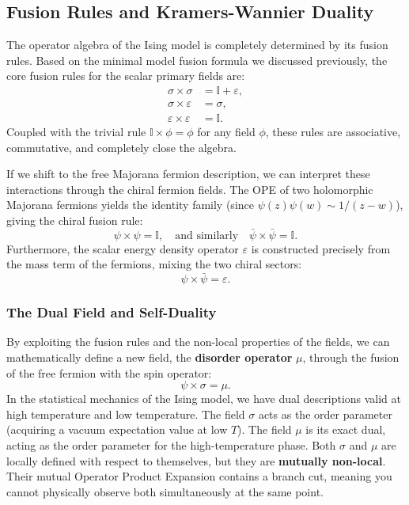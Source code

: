 \subsection{Fusion Rules and Kramers-Wannier Duality}

The operator algebra of the Ising model is completely determined by its fusion rules. Based on the minimal model fusion formula we discussed previously, the core fusion rules for the scalar primary fields are:
\[
    \begin{aligned}
        \sigma \times \sigma           & = \mathbb{I} + \varepsilon, \\
        \sigma \times \varepsilon      & = \sigma,                   \\
        \varepsilon \times \varepsilon & = \mathbb{I}.
    \end{aligned}
\]
Coupled with the trivial rule \(\mathbb{I} \times \phi = \phi\) for any field \(\phi\), these rules are associative, commutative, and completely close the algebra.

If we shift to the free Majorana fermion description, we can interpret these interactions through the chiral fermion fields. The OPE of two holomorphic Majorana fermions yields the identity family (since \(\psi(z)\psi(w) \sim 1/(z-w)\)), giving the chiral fusion rule:
\[
    \psi \times \psi = \mathbb{I}, \quad \text{and similarly} \quad \bar{\psi} \times \bar{\psi} = \mathbb{I}.
\]
Furthermore, the scalar energy density operator \(\varepsilon\) is constructed precisely from the mass term of the fermions, mixing the two chiral sectors:
\[
    \psi \times \bar{\psi} = \varepsilon.
\]

\subsubsection{The Dual Field and Self-Duality}

By exploiting the fusion rules and the non-local properties of the fields, we can mathematically define a new field, the \textbf{disorder operator} \(\mu\), through the fusion of the free fermion with the spin operator:
\[
    \psi \times \sigma = \mu.
\]
In the statistical mechanics of the Ising model, we have dual descriptions valid at high temperature and low temperature. The field \(\sigma\) acts as the order parameter (acquiring a vacuum expectation value at low \(T\)). The field \(\mu\) is its exact dual, acting as the order parameter for the high-temperature phase. Both \(\sigma\) and \(\mu\) are locally defined with respect to themselves, but they are \textbf{mutually non-local}. Their mutual Operator Product Expansion contains a branch cut, meaning you cannot physically observe both simultaneously at the same point.

